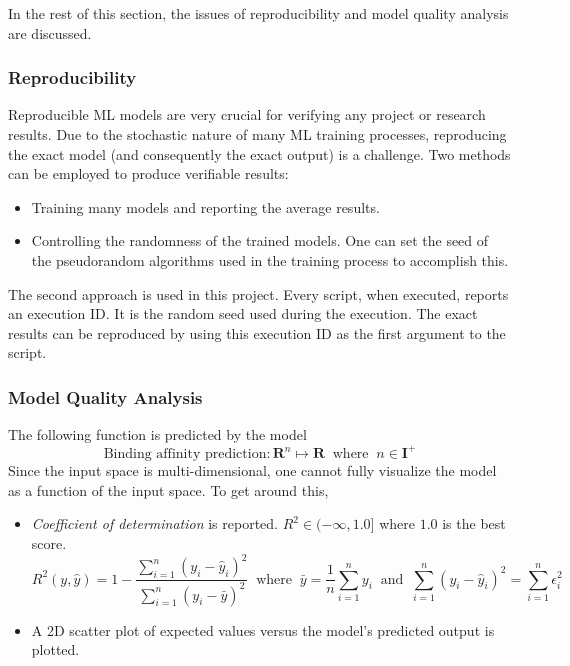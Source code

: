 \documentclass[11pt]{article}
\begin{document}
In the rest of this section, the issues of reproducibility and model quality analysis are discussed.


\subsubsection{Reproducibility}
Reproducible ML models are very crucial for verifying any project or research results. Due to the stochastic nature of many ML training processes, reproducing the exact model (and consequently the exact output) is a challenge. Two methods can be employed to produce verifiable results:
\begin{itemize}
\item Training many models and reporting the average results.
\item Controlling the randomness of the trained models. One can set the seed of the pseudorandom algorithms used in the training process to accomplish this.
\end{itemize}

The second approach is used in this project. Every script, when executed, reports an execution ID. It is the random seed used during the execution.  The exact results can be reproduced by using this execution ID as the first argument to the script.


\subsubsection{Model Quality Analysis}
The following function is predicted by the model
$$ \textrm{Binding affinity prediction} : \mathbf{R}^n \mapsto \mathbf{R} \;\; \textrm{where} \;\; n \in \mathbf{I}^+$$
Since the input space is multi-dimensional,  one cannot fully visualize the model as a function of the input space.
To get around this,
\begin{itemize}
\item \textit{Coefficient of determination} is reported. $R^2  \in (- \infty, 1.0]$ where $1.0$ is the best score. \cite{r_squared_score}
$$R^2(y, \hat{y}) = 1 - \frac{\sum_{i=1}^{n} (y_i - \hat{y}_i)^2}{\sum_{i=1}^{n} (y_i - \bar{y})^2} \;\; \textrm{where} \;\; \bar{y} = \frac{1}{n} \sum_{i=1}^{n} y_i \;\;
\textrm{and} \;\; \sum_{i=1}^{n} (y_i - \hat{y}_i)^2 = \sum_{i=1}^{n} \epsilon_i^2$$

\item A 2D scatter plot of expected values versus the model's predicted output is plotted.
\end{itemize}
\end{document}
